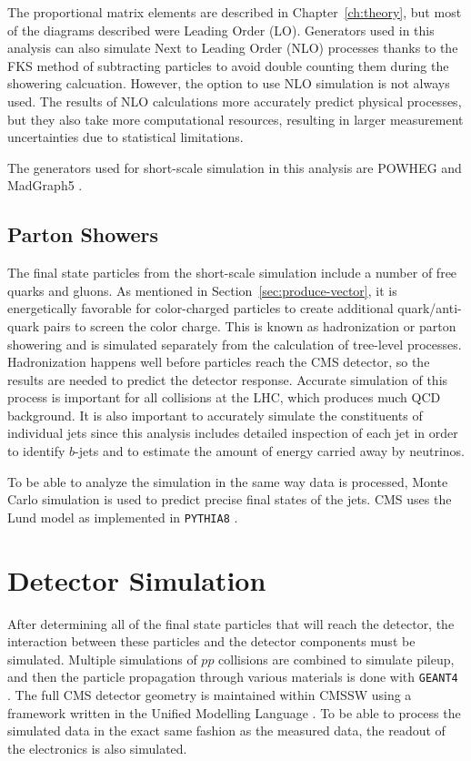 The proportional matrix elements are described in Chapter~\ref{ch:theory},
but most of the diagrams described were Leading Order (LO).
Generators used in this analysis can also simulate Next to Leading Order (NLO) processes
thanks to the FKS method of subtracting particles to avoid double counting them during the
showering calcuation.
However, the option to use NLO simulation is not always used.
The results of NLO calculations more accurately predict physical processes,
but they also take more computational resources,
resulting in larger measurement uncertainties due to statistical limitations.

The generators used for short-scale simulation in this analysis
are POWHEG \cite{Oleari_2010} and MadGraph5 \cite{hirschi2015automated}.

\subsection{Parton Showers}

The final state particles from the short-scale simulation
include a number of free quarks and gluons.
As mentioned in Section~\ref{sec:produce-vector},
it is energetically favorable for color-charged particles to create additional
quark/anti-quark pairs to screen the color charge.
This is known as hadronization or parton showering and
is simulated separately from the calculation of tree-level processes.
Hadronization happens well before particles reach the CMS detector,
so the results are needed to predict the detector response.
Accurate simulation of this process is important for all collisions at the LHC,
which produces much QCD background.
It is also important to accurately simulate the constituents of individual jets
since this analysis includes detailed inspection of each jet
in order to identify $b$-jets and to estimate the amount of energy carried away by neutrinos.

To be able to analyze the simulation in the same way data is processed,
Monte Carlo simulation is used to predict precise final states of the jets.
CMS uses the Lund model \cite{ANDERSSON198331} as implemented in
\texttt{PYTHIA8} \cite{SJOSTRAND2015159}.

\section{Detector Simulation}

After determining all of the final state particles that will reach the detector,
the interaction between these particles and the detector components must be simulated.
Multiple simulations of $pp$ collisions are combined to simulate pileup,
and then the particle propagation through various materials is done with
\texttt{GEANT4} \cite{AGOSTINELLI2003250}.
The full CMS detector geometry is maintained within CMSSW \cite{Hildreth_2015}
using a framework written in the Unified Modelling Language \cite{Lefebure:687188}.
To be able to process the simulated data in the exact same fashion as the measured data,
the readout of the electronics is also simulated.

